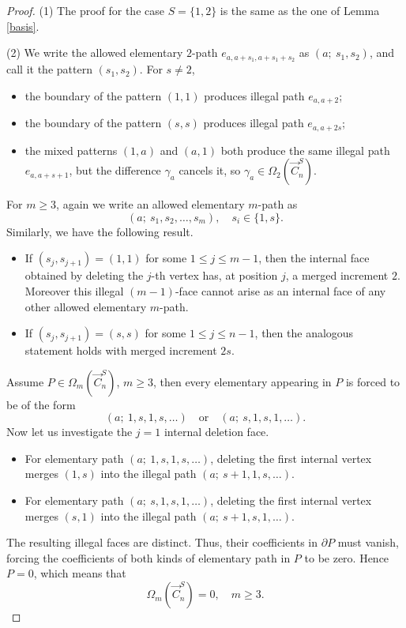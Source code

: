 \documentclass[11pt]{amsart}
\theoremstyle{plain}
\theoremstyle{definition}
\numberwithin{equation}{section}
\begin{document}
\begin{proof}
(1) The proof for the case $S=\{1,2\}$ is the same as the one of Lemma \ref{basis}. 

\vskip 0.2cm
(2) We write the allowed elementary $2$-path $e_{a,a+s_1,a+s_1+s_2}$ as $(a;~s_1,s_2)$, and call it the pattern $(s_1,s_2)$. For $s\neq2$, 
\begin{itemize}
    \item the boundary of the pattern $(1,1)$ produces illegal path $e_{a,a+2}$;
    \item the boundary of the pattern $(s,s)$ produces illegal path $e_{a,a+2s}$;
    \item the mixed patterns $(1,a)$ and $(a,1)$ both produce the same illegal path $e_{a,a+s+1}$, but the difference $\gamma_a$ cancels it, so $\gamma_a\in\Omega_2(\vec{C}_n^S)$.
\end{itemize}
For $m\geq3$, again we write an allowed elementary $m$-path as
\[(a;~s_1,s_2,\ldots,s_m),\quad s_i\in\{1,s\}.\]
Similarly, we have the following result.
\begin{itemize}
    \item If $(s_j,s_{j+1})=(1,1)$ for some $1\le j\le m-1$, then the internal face obtained by deleting the $j$-th vertex
has, at position $j$, a merged increment $2$.
Moreover this illegal $(m-1)$-face cannot arise as an internal face of any other allowed elementary $m$-path.
\item If $(s_j,s_{j+1})=(s,s)$ for some $1\le j\le n-1$, then the analogous statement holds with merged increment $2s$.
\end{itemize}
Assume $P\in\Omega_m(\vec{C}_n^S)$, $m\ge3$, then every elementary appearing in $P$ is forced to be of the form
\[(a;~1,s,1,s,\ldots)\quad\text{or}\quad (a;~s,1,s,1,\ldots).\]
Now let us investigate the $j=1$ internal deletion face. 
\begin{itemize}
    \item For elementary path $(a;~1,s,1,s,\ldots)$, deleting the first internal vertex merges $(1,s)$ into the illegal path $(a;~s+1,1,s,\ldots)$.
    \item For elementary path $(a;~s,1,s,1,\ldots)$, deleting the first internal vertex merges $(s,1)$ into the illegal path $(a;~s+1,s,1,\ldots)$.
\end{itemize}
The resulting illegal faces are distinct. Thus, their coefficients in $\partial P$ must vanish, forcing the coefficients of both kinds of elementary path in $P$ to be zero. Hence $P=0$, which means that 
\[\Omega_m(\vec{C}_n^S)=0, \quad m\geq3.\]
\end{proof}
\end{document}
